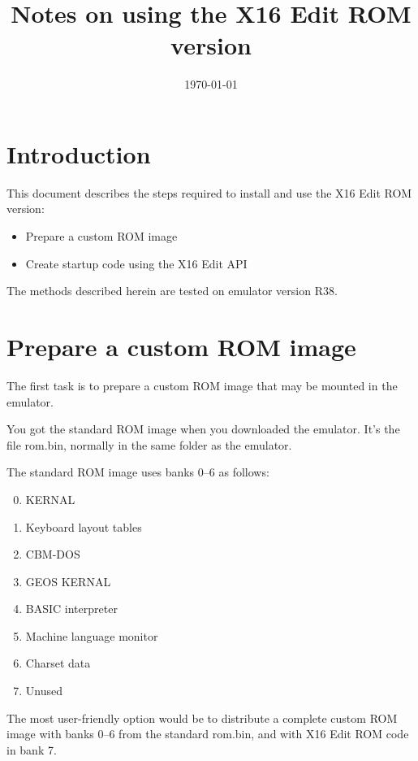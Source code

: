 \documentclass{article}
\title{Notes on using the X16 Edit ROM version}
\date{\today}
\begin{document}
\maketitle

\section{Introduction}

    This document describes the steps required to install and use the X16 Edit ROM version:

    \begin{itemize}
        \item Prepare a custom ROM image
        \item Create startup code using the X16 Edit API
    \end{itemize}

    \noindent The methods described herein are tested on emulator version R38.

\section{Prepare a custom ROM image}

    The first task is to prepare a custom ROM image that may be mounted in the emulator.

    You got the standard ROM image when you downloaded the emulator. It's the file
    rom.bin, normally in the same folder as the emulator.

    The standard ROM image uses banks 0--6 as follows:

    \begin{enumerate}
        \setcounter{enumi}{-1}
        \item KERNAL
        \item Keyboard layout tables
        \item CBM-DOS
        \item GEOS KERNAL
        \item BASIC interpreter
        \item Machine language monitor
        \item Charset data
        \item Unused
    \end{enumerate}

    \noindent The most user-friendly option would be to distribute a complete custom ROM image with
    banks 0--6 from the standard rom.bin, and with X16 Edit ROM code in bank 7.
\end{document}
